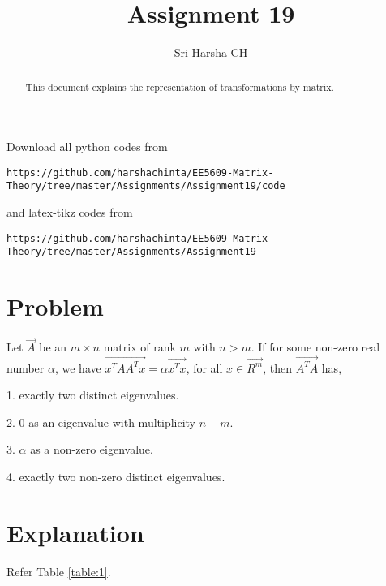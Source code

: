 \documentclass[journal,12pt,twocolumn]{IEEEtran}
\begin{document}
\renewcommand{\thefigure}{\theproblem}

\def\putbox#1#2#3{\makebox[0in][l]{\makebox[#1][l]{}\raisebox{\baselineskip}[0in][0in]{\raisebox{#2}[0in][0in]{#3}}}}
     \def\rightbox#1{\makebox[0in][r]{#1}}
     \def\centbox#1{\makebox[0in]{#1}}
     \def\topbox#1{\raisebox{-\baselineskip}[0in][0in]{#1}}
     \def\midbox#1{\raisebox{-0.5\baselineskip}[0in][0in]{#1}}
\vspace{3cm}
\title{Assignment 19}
\author{Sri Harsha CH}

\maketitle
\newpage

\bigskip
\renewcommand{\thefigure}{\theenumi}
\renewcommand{\thetable}{\theenumi}

\begin{abstract}
This document explains the representation of transformations by matrix.
\end{abstract}

Download all python codes from 
\begin{lstlisting}
https://github.com/harshachinta/EE5609-Matrix-Theory/tree/master/Assignments/Assignment19/code
\end{lstlisting}
%
and latex-tikz codes from 
%
\begin{lstlisting}
https://github.com/harshachinta/EE5609-Matrix-Theory/tree/master/Assignments/Assignment19
\end{lstlisting}
%
\section{Problem}
Let $\vec{A}$ be an $m \times n$ matrix of rank $m$ with $n>m$. If for some non-zero real number $\alpha$, we have $\vec{x^TAA^Tx} = \alpha\vec{x^Tx}$, for all $x \in \vec{R^m}$, then $\vec{A^TA}$ has,

1. exactly two distinct eigenvalues.

2. 0 as an eigenvalue with multiplicity $n-m$.

3. $\alpha$ as a non-zero eigenvalue.

4. exactly two non-zero distinct eigenvalues.

\section{Explanation}
Refer Table \ref{table:1}.
\end{document}
